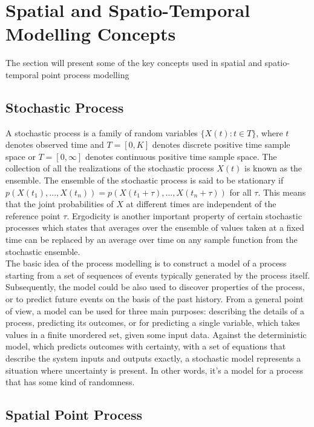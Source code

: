 \documentclass[a4paper]{thesis}
\begin{document}
\section{Spatial and Spatio-Temporal Modelling Concepts}

The section will present some of the key concepts used in spatial and spatio-temporal point process modelling

\subsection{Stochastic Process}
 
A stochastic process is a family of random variables $\lbrace X(t):t\in T \rbrace$, where $t$ denotes observed time and $T = \left[ 0,K \right]$ denotes discrete positive time sample space or $T = \left[ 0,\infty \right]$ denotes continuous positive time sample space. The collection of all the realizations of the stochastic process $X(t)$ is known as the ensemble. The ensemble of the stochastic process is said to be stationary if $p(X(t_1),...,X(t_n)) = p(X(t_1 + \tau),...,X(t_n + \tau))$ for all $\tau$. This means that the joint probabilities of $X$ at different times are independent of the reference point $\tau$. Ergodicity is another important property of certain stochastic processes which states that averages over the ensemble of values taken at a fixed time can be replaced by an average over time on any sample function from the stochastic ensemble.\\

The basic idea of the process modelling is to construct a model of a process starting from a set of sequences of events typically generated by the process itself. Subsequently, the model could be also used to discover properties of the process, or to predict future events on the basis of the past history. From a general point of view, a model can be used for three main purposes: describing the details of a process, predicting its outcomes, or for predicting a single variable, which takes values in a finite unordered set, given some input data. Against the deterministic model, which predicts outcomes with certainty, with a set of equations that describe the system inputs and outputs exactly, a stochastic model represents a situation where uncertainty is present. In other words, it’s a model for a process that has some kind of randomness. 

\subsection{Spatial Point Process}
\end{document}
